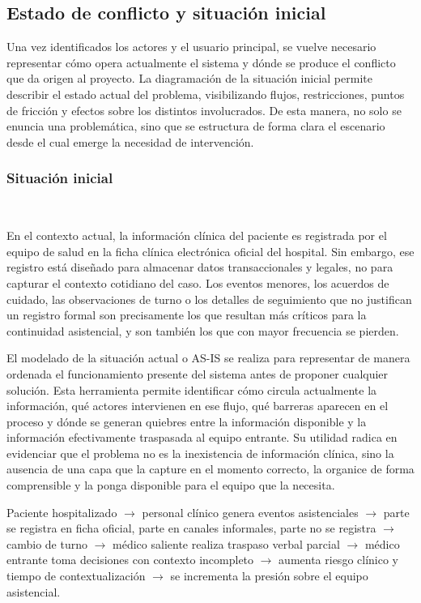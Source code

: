 \subsection{Estado de conflicto y situación inicial}
Una vez identificados los actores y el usuario principal, se vuelve necesario representar cómo opera actualmente el sistema y dónde se produce el conflicto que da origen al proyecto. La diagramación de la situación inicial permite describir el estado actual del problema, visibilizando flujos, restricciones, puntos de fricción y efectos sobre los distintos involucrados. De esta manera, no solo se enuncia una problemática, sino que se estructura de forma clara el escenario desde el cual emerge la necesidad de intervención.\\

\subsubsection*{Situación inicial} ~

En el contexto actual, la información clínica del paciente es registrada por el equipo de salud en la ficha clínica electrónica oficial del hospital. Sin embargo, ese registro está diseñado para almacenar datos transaccionales y legales, no para capturar el contexto cotidiano del caso. Los eventos menores, los acuerdos de cuidado, las observaciones de turno o los detalles de seguimiento que no justifican un registro formal son precisamente los que resultan más críticos para la continuidad asistencial, y son también los que con mayor frecuencia se pierden.

El modelado de la situación actual o AS-IS se realiza para representar de manera ordenada el funcionamiento presente del sistema antes de proponer cualquier solución. Esta herramienta permite identificar cómo circula actualmente la información, qué actores intervienen en ese flujo, qué barreras aparecen en el proceso y dónde se generan quiebres entre la información disponible y la información efectivamente traspasada al equipo entrante. Su utilidad radica en evidenciar que el problema no es la inexistencia de información clínica, sino la ausencia de una capa que la capture en el momento correcto, la organice de forma comprensible y la ponga disponible para el equipo que la necesita.

Paciente hospitalizado $\rightarrow$ personal clínico genera eventos asistenciales $\rightarrow$ parte se registra en ficha oficial, parte en canales informales, parte no se registra $\rightarrow$ cambio de turno $\rightarrow$ médico saliente realiza traspaso verbal parcial $\rightarrow$ médico entrante toma decisiones con contexto incompleto $\rightarrow$ aumenta riesgo clínico y tiempo de contextualización $\rightarrow$ se incrementa la presión sobre el equipo asistencial.\\

